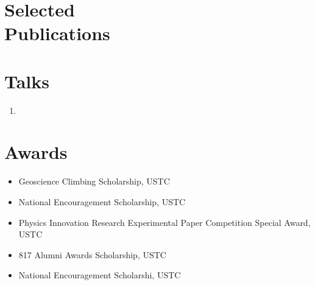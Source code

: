 \documentclass{mycv}
\begin{document}
\section{Selected \\ Publications}%

\section{Talks}

\begin{enumerate}
  \item
\end{enumerate}

\section{Awards}

\begin{itemize}
  \item Geoscience Climbing Scholarship, USTC 
  \item National Encouragement Scholarship, USTC 
  \item Physics Innovation Research Experimental Paper Competition Special Award, USTC 
  \item 817 Alumni Awards Scholarship, USTC 
  \item National Encouragement Scholarshi, USTC 
\end{itemize}
\end{document}
